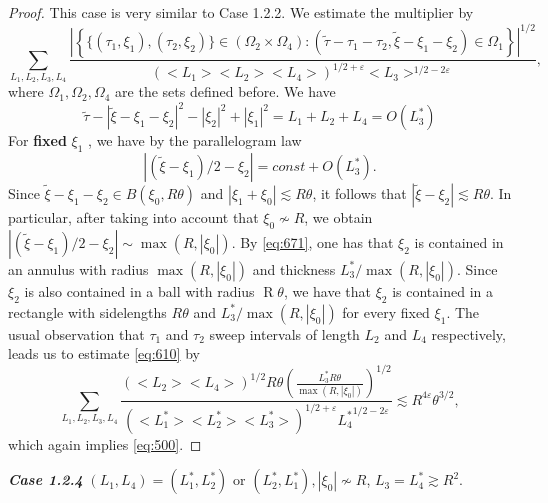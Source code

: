\documentclass[draft,11pt,leqno]{amsart}
\newcommand{\ve}{\varepsilon}
\newcommand{\Om}{\Omega}
\newcommand{\suml}{\sum\limits}
\newcommand{\f}{\displaystyle\frac}
\newcommand{\R}{\operatorname{R}}
\newcommand{\lone}{{L_1^{*}}}
\newcommand{\ltwo}{{L_2^{*}}}
\newcommand{\lthree}{{L_3^{*}}}
\newcommand{\lfour}{{L_4^{*}}}
\begin{document}
\begin{proof}
This case is very similar to Case 1.2.2. We estimate the
multiplier by
\begin{equation}
\label{eq:610}
 \suml_{L_1,L_2,L_3,L_4}\f{\left|
\left\{\{(\tau_1,\xi_1),(\tau_2,\xi_2)\}\in(\Om_2\times\Om_4):(\tilde{\tau}-\tau_1-\tau_2,
\tilde{\xi}-\xi_1-\xi_2)\in
\Om_1\right\}\right|^{1/2}}{(<L_1><L_2><L_4>)^{1/2+\ve}<L_3>^{1/2-2\ve}},
\end{equation}
where $\Om_1, \Om_2, \Om_4$ are the sets defined before. We have $$
\tilde{\tau}-|\tilde{\xi}-\xi_1-\xi_2|^2-|\xi_2|^2+|\xi_1|^2=L_1+L_2+L_4=O(\lthree)$$ 
For {\bf fixed} $\xi_1$ , we have by the parallelogram law
\begin{equation}
\label{eq:671}
 |(\tilde{\xi}-\xi_1)/2-\xi_2|=const+O(\lthree).
\end{equation}
Since $\tilde{\xi}-\xi_1-\xi_2\in B(\xi_0, R\theta)$ and
$|\xi_1+\xi_0|\lesssim R\theta$, it follows that
$|\tilde{\xi}-\xi_2|\lesssim R\theta$. In particular, after taking into
account that $\xi_0\nsim R$, we obtain
$|(\tilde{\xi}-\xi_1)/2-\xi_2|\sim \max(R,|\xi_0|).$ By
\eqref{eq:671}, one has that $\xi_2$ is contained in an annulus
with radius $\max(R,|\xi_0|)$ and thickness
$\lthree/\max(R,|\xi_0|)$. Since $\xi_2$ is also contained in a
ball with radius $\R \theta$, we have that $\xi_2$ is contained in
a rectangle with sidelengths $R\theta$ and
$\lthree/\max(R,|\xi_0|)$ for every fixed $\xi_1$. The usual
observation that $\tau_1$ and $\tau_2$ sweep intervals of length
$L_2$ and $L_4$ respectively, leads us to estimate \eqref{eq:610} by
$$ \suml_{L_1,L_2,L_3,L_4}\f{(<L_2><L_4>)^{1/2} R\theta \left(\f{\lthree
R\theta}{\max(R,|\xi_0|)}\right)^{1/2}}{(<\lone><\ltwo><\lthree>)^{1/2+\ve}\lfour^{1/2-2\ve}}
\lesssim R^{4\ve}\theta^{3/2},$$
which again implies \eqref{eq:500}.
\end{proof}

{\it\bf Case 1.2.4} $(L_1,L_4)=(\lone,\ltwo)$ or 
$(\ltwo,\lone), |\xi_0|\nsim R$, $L_3=\lfour\gtrsim R^2$.
\end{document}

